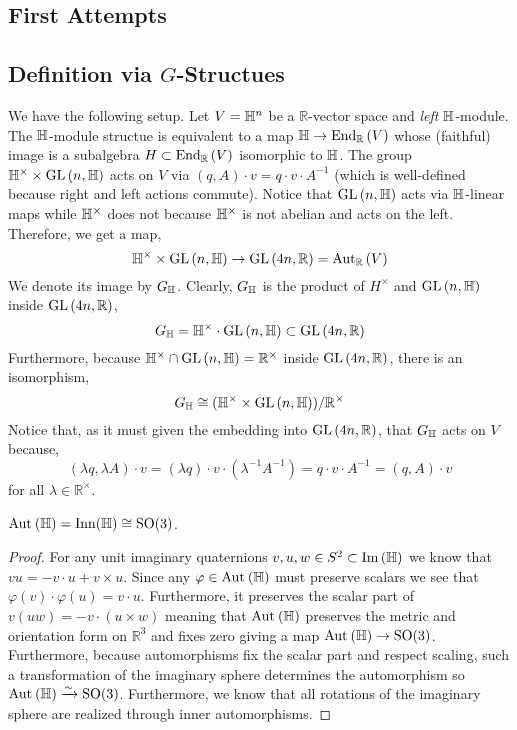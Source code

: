 \documentclass[12pt]{extarticle}
\newcommand{\R}{\mathbb{R}}
\begin{document}
\subsection{First Attempts}

\subsection{Definition via $G$-Structues}

\begin{rmk}
We have the following setup. Let $V = \mathbb{H}^n$ be a $\R$-vector space and \textit{left} $\mathbb{H}$-module. The $\mathbb{H}$-module structue is equivalent to a map $\H \to \End{\R}{V}$ whose (faithful) image is a subalgebra $H \subset \End{\R}{V}$ isomorphic to $\mathbb{H}$. The group $\mathbb{H}^\times \times \mathrm{GL}\left(n, \mathbb{H} \right)$ acts on $V$ via $(q, A) \cdot v = q \cdot v \cdot A^{-1}$ (which is well-defined because right and left actions commute). Notice that $\mathrm{GL}\left(n, \mathbb{H} \right)$ acts via $\mathbb{H}$-linear maps while $\mathbb{H}^\times$ does not because $\mathbb{H}^\times$ is not abelian and acts on the left. Therefore, we get a map,
\[ \H^\times \times \GL{n, \H} \to \GL{4n, \R} = \Aut{\R}{V} \]  We denote its image by $G_{\mathbb{H}}$. Clearly, $G_{\mathbb{H}}$ is the product of $H^\times$ and $\mathrm{GL}\left(n, \mathbb{H} \right)$ inside $\GL{4n, \R}$,
\[ G_{\H} = \H^\times \cdot \GL{n, \H} \subset \GL{4n, \R} \]
Furthermore, because $\H^\times \cap \GL{n, \H} = \R^\times$ inside $\GL{4n, \R}$, there is an isomorphism,
\[ G_{\H} \cong (\H^\times \times \GL{n, \H})/\R^\times \]
Notice that, as it must given the embedding into $\GL{4n, \R}$, that $G_{\mathbb{H}}$ acts on $V$ because,
\[ (\lambda q, \lambda A) \cdot v = (\lambda q) \cdot v \cdot (\lambda^{-1} A^{-1}) = q \cdot v \cdot A^{-1} =  (q, A) \cdot v  \]
for all $\lambda \in \R^\times$.
\end{rmk}

\begin{lemma}
$\mathrm{Aut}_{}\left(\mathbb{H}\right) = \mathrm{Inn}(\mathbb{H}) \cong \mathrm{SO}(3)$.
\end{lemma}

\begin{proof}
For any unit imaginary quaternions $v, u, w \in S^2 \subset \mathrm{Im}\left( \mathbb{H} \right)$ we know that $vu = - v \cdot u + v \times u$. Since any $\varphi \in \mathrm{Aut}_{}\left(\mathbb{H}\right)$ must preserve scalars we see that $\varphi(v) \cdot \varphi(u) = v \cdot u$. Furthermore, it preserves the scalar part of $v(uw) = - v \cdot (u \times w)$ meaning that $\mathrm{Aut}_{}\left(\mathbb{H}\right)$ preserves the metric and orientation form on $\R^3$ and fixes zero giving a map $\mathrm{Aut}_{}\left(\mathbb{H}\right) \to \mathrm{SO}(3)$. Furthermore, because automorphisms fix the scalar part and respect scaling, such a transformation of the imaginary sphere determines the automorphism so $\mathrm{Aut}_{}\left(\mathbb{H}\right) \xrightarrow{\sim} \mathrm{SO}(3)$. Furthermore, we know that all rotations of the imaginary sphere are realized through inner automorphisms.
\end{proof}
\end{document}
